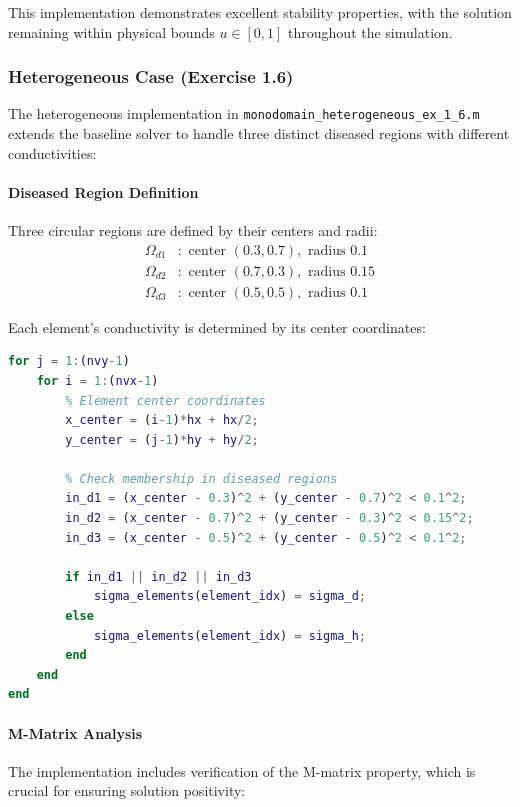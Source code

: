 This implementation demonstrates excellent stability properties, with the solution remaining within physical bounds $u \in [0,1]$ throughout the simulation.

\subsubsection{Heterogeneous Case (Exercise 1.6)}

The heterogeneous implementation in \texttt{monodomain\_heterogeneous\_ex\_1\_6.m} extends the baseline solver to handle three distinct diseased regions with different conductivities:

\paragraph{Diseased Region Definition}
Three circular regions are defined by their centers and radii:
\begin{align}
\Omega_{d1} &: \text{ center } (0.3, 0.7), \text{ radius } 0.1 \\
\Omega_{d2} &: \text{ center } (0.7, 0.3), \text{ radius } 0.15 \\
\Omega_{d3} &: \text{ center } (0.5, 0.5), \text{ radius } 0.1
\end{align}

Each element's conductivity is determined by its center coordinates:

\begin{lstlisting}[language=Matlab, caption=Heterogeneous conductivity assignment]
for j = 1:(nvy-1)
    for i = 1:(nvx-1)
        % Element center coordinates
        x_center = (i-1)*hx + hx/2;
        y_center = (j-1)*hy + hy/2;
        
        % Check membership in diseased regions
        in_d1 = (x_center - 0.3)^2 + (y_center - 0.7)^2 < 0.1^2;
        in_d2 = (x_center - 0.7)^2 + (y_center - 0.3)^2 < 0.15^2;
        in_d3 = (x_center - 0.5)^2 + (y_center - 0.5)^2 < 0.1^2;
        
        if in_d1 || in_d2 || in_d3
            sigma_elements(element_idx) = sigma_d;
        else
            sigma_elements(element_idx) = sigma_h;
        end
    end
end
\end{lstlisting}

\paragraph{M-Matrix Analysis}
The implementation includes verification of the M-matrix property, which is crucial for ensuring solution positivity:

